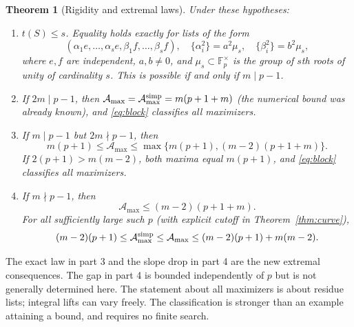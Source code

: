 \documentclass[11pt]{article}
\newtheorem{theorem}{Theorem}[section]
\theoremstyle{remark}\newtheorem{remark}[theorem]{Remark}
\newcommand{\F}{\mathbb F}
\newcommand{\A}{\mathcal A}
\begin{document}
\begin{theorem}[Rigidity and extremal laws]\label{thm:main}
Under these hypotheses:
\begin{enumerate}
\item $t(S)\le s$. Equality holds exactly for lists of the form
\begin{equation}\label{eq:block}
 (\alpha_1 e,\ldots,\alpha_s e,\beta_1 f,\ldots,\beta_s f),
\quad \{\alpha_i^2\}=a^2\mu_s,\quad \{\beta_i^2\}=b^2\mu_s,
\end{equation}
where $e,f$ are independent, $a,b\ne0$, and $\mu_s\subset\F_p^\times$ is the group of $s$th roots of unity of cardinality $s$. This is possible if and only if $m\mid p-1$.
\item If $2m\mid p-1$, then $\A_{\max}=\A_{\max}^{\rm simp}=m(p+1+m)$ (the numerical bound was already known), and \eqref{eq:block} classifies all maximizers.
\item If $m\mid p-1$ but $2m\nmid p-1$, then
\begin{equation}\label{eq:middle}
 m(p+1)\le\A_{\max}\le\max\{m(p+1),(m-2)(p+1+m)\}.
\end{equation}
If $2(p+1)>m(m-2)$, both maxima equal $m(p+1)$, and \eqref{eq:block} classifies all maximizers.
\item If $m\nmid p-1$, then
\begin{equation}\label{eq:low}
 \A_{\max}\le(m-2)(p+1+m).
\end{equation}
For all sufficiently large such $p$ (with explicit cutoff in Theorem~\ref{thm:curve}),
\begin{equation}\label{eq:asy}
 (m-2)(p+1)\le\A_{\max}^{\rm simp}\le\A_{\max}\le(m-2)(p+1)+m(m-2).
\end{equation}
\end{enumerate}
\end{theorem}
The exact law in part 3 and the slope drop in part 4 are the new extremal consequences. The gap in part 4 is bounded independently of $p$ but is not generally determined here. The statement about all maximizers is about residue lists; integral lifts can vary freely. The classification is stronger than an example attaining a bound, and requires no finite search.
\end{document}
